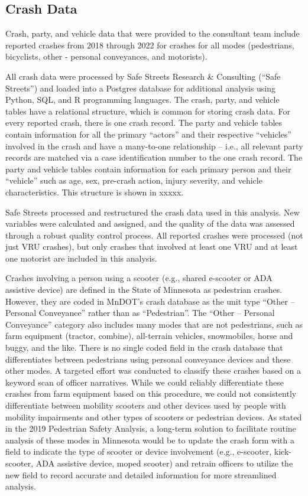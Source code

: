 \documentclass[
  letterpaper,
]{scrbook}
\begin{document}
\hypertarget{crash-data}{%
\subsection{Crash Data}\label{crash-data}}

Crash, party, and vehicle data that were provided to the consultant team
include reported crashes from 2018 through 2022 for crashes for all
modes (pedestrians, bicyclists, other - personal conveyances, and
motorists).

All crash data were processed by Safe Streets Research \& Consulting
(``Safe Streets'') and loaded into a Postgres database for additional
analysis using Python, SQL, and R programming languages. The crash,
party, and vehicle tables have a relational structure, which is common
for storing crash data. For every reported crash, there is one crash
record. The party and vehicle tables contain information for all the
primary ``actors'' and their respective ``vehicles'' involved in the
crash and have a many-to-one relationship -- i.e., all relevant party
records are matched via a case identification number to the one crash
record. The party and vehicle tables contain information for each
primary person and their ``vehicle'' such as age, sex, pre-crash action,
injury severity, and vehicle characteristics. This structure is shown in
xxxxx.

Safe Streets processed and restructured the crash data used in this
analysis. New variables were calculated and assigned, and the quality of
the data was assessed through a robust quality control process. All
reported crashes were processed (not just VRU crashes), but only crashes
that involved at least one VRU and at least one motorist are included in
this analysis.

Crashes involving a person using a scooter (e.g., shared e-scooter or
ADA assistive device) are defined in the State of Minnesota as
pedestrian crashes. However, they are coded in MnDOT's crash database as
the unit type ``Other -- Personal Conveyance'' rather than as
``Pedestrian''. The ``Other -- Personal Conveyance'' category also
includes many modes that are not pedestrians, such as farm equipment
(tractor, combine), all-terrain vehicles, snowmobiles, horse and buggy,
and the like. There is no single coded field in the crash database that
differentiates between pedestrians using personal conveyance devices and
these other modes. A targeted effort was conducted to classify these
crashes based on a keyword scan of officer narratives. While we could
reliably differentiate these crashes from farm equipment based on this
procedure, we could not consistently differentiate between mobility
scooters and other devices used by people with mobility impairments and
other types of scooters or pedestrian devices. As stated in the 2019
Pedestrian Safety Analysis, a long-term solution to facilitate routine
analysis of these modes in Minnesota would be to update the crash form
with a field to indicate the type of scooter or device involvement
(e.g., e-scooter, kick-scooter, ADA assistive device, moped scooter) and
retrain officers to utilize the new field to record accurate and
detailed information for more streamlined analysis.
\end{document}
